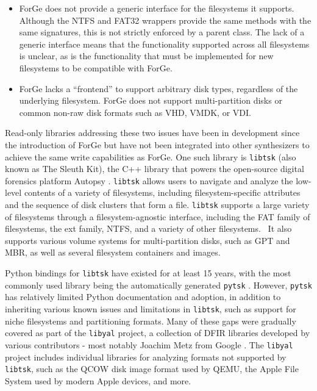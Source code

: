 \documentclass[letterpaper,12pt]{report}
\def\tightlist{}
\newcommand{\passthrough}[1]{#1}
\begin{document}
\begin{itemize}
\tightlist
\item
  ForGe does not provide a generic interface for the filesystems it
  supports. Although the NTFS and FAT32 wrappers provide the same
  methods with the same signatures, this is not strictly enforced by a
  parent class. The lack of a generic interface means that the
  functionality supported across all filesystems is unclear, as is the
  functionality that must be implemented for new filesystems to be
  compatible with ForGe.
\item
  ForGe lacks a ``frontend'' to support arbitrary disk types, regardless
  of the underlying filesystem. ForGe does not support multi-partition
  disks or common non-raw disk formats such as VHD, VMDK, or VDI.
\end{itemize}

Read-only libraries addressing these two issues have been in development
since the introduction of ForGe but have not been integrated into other
synthesizers to achieve the same write capabilities as ForGe. One such
library is \passthrough{\lstinline!libtsk!} (also known as The Sleuth
Kit), the C++ library that powers the open-source digital forensics
platform Autopsy \cite{SleuthkitSleuthkit2025}.
\passthrough{\lstinline!libtsk!} allows users to navigate and analyze
the low-level contents of a variety of filesystems, including
filesystem-specific attributes and the sequence of disk clusters that
form a file. \passthrough{\lstinline!libtsk!} supports a large variety
of filesystems through a filesystem-agnostic interface, including the
FAT family of filesystems, the ext family, NTFS, and a variety of other
filesystems. ~It also supports various volume systems for
multi-partition disks, such as GPT and MBR, as well as several
filesystem containers and images.

Python bindings for \passthrough{\lstinline!libtsk!} have existed for at
least 15 years, with the most commonly used library being the
automatically generated \passthrough{\lstinline!pytsk!}
\cite{Py4n6Pytsk2025}. However, \passthrough{\lstinline!pytsk!} has
relatively limited Python documentation and adoption, in addition to
inheriting various known issues and limitations in
\passthrough{\lstinline!libtsk!}, such as support for niche filesystems
and partitioning formats. Many of these gaps were gradually covered as
part of the \passthrough{\lstinline!libyal!} project, a collection of
DFIR libraries developed by various contributors - most notably Joachim
Metz from Google \cite{LibyalLibyal2025}. The
\passthrough{\lstinline!libyal!} project includes individual libraries
for analyzing formats not supported by \passthrough{\lstinline!libtsk!},
such as the QCOW disk image format used by QEMU, the Apple File System
used by modern Apple devices, and more.
\end{document}
